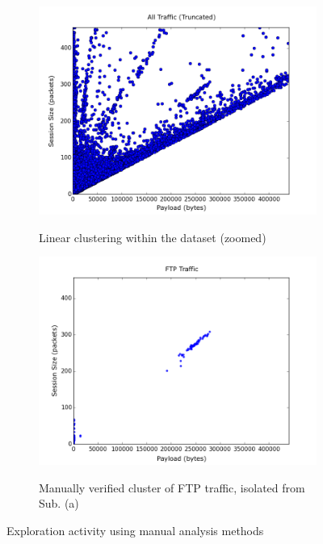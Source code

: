 \begin{figure}
	\centering
	\begin{subfigure}{9cm}
	\centering
	\includegraphics[width=\linewidth]{paperplots/everything.png}
	\label{subfig:all_traffic}
	\caption{Linear clustering within the dataset (zoomed)}
	\end{subfigure}%
	\begin{subfigure}{9cm}
	\centering
	\includegraphics[width=\linewidth]{paperplots/ftp.png}
	\label{subfig:ftp}
	\caption{Manually verified cluster of FTP traffic, isolated from Sub. (a)}
	\end{subfigure}
	\caption{Exploration activity using manual analysis methods}
	\label{fig:explore}
\end{figure}


